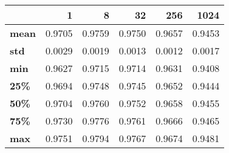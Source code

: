 \begin{tabular}{lrrrrr}
\toprule
{} &       1 &       8 &      32 &     256 &    1024 \\
\midrule
\textbf{mean} &  0.9705 &  0.9759 &  0.9750 &  0.9657 &  0.9453 \\
\textbf{std } &  0.0029 &  0.0019 &  0.0013 &  0.0012 &  0.0017 \\
\textbf{min } &  0.9627 &  0.9715 &  0.9714 &  0.9631 &  0.9408 \\
\textbf{25\% } &  0.9694 &  0.9748 &  0.9745 &  0.9652 &  0.9444 \\
\textbf{50\% } &  0.9704 &  0.9760 &  0.9752 &  0.9658 &  0.9455 \\
\textbf{75\% } &  0.9730 &  0.9776 &  0.9761 &  0.9666 &  0.9465 \\
\textbf{max } &  0.9751 &  0.9794 &  0.9767 &  0.9674 &  0.9481 \\
\bottomrule
\end{tabular}
